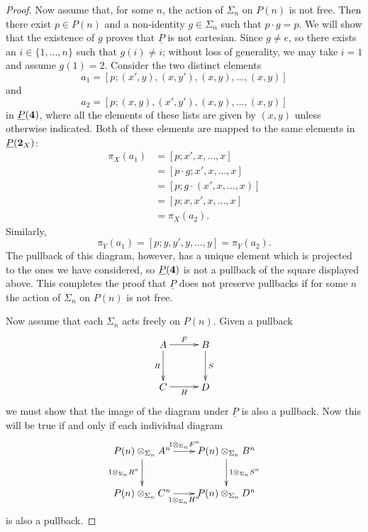 \begin{proof}
Now assume that, for some $n$, the action of $\Sigma_n$ on $P(n)$ is not free. Then there exist $p \in P(n)$ and a non-identity $g \in \Sigma_n$ such that $p \cdot g = p$. We will show that the existence of $g$ proves that $\underline{P}$ is not cartesian.
Since $g \neq e$, so there exists an $i \in \{1, \ldots, n\}$ such that $g(i) \neq i$; without loss of generality, we may take $i=1$ and assume $g(1)=2$. Consider the two distinct elements
    \[
      a_1=  \left[p;(x',y),(x,y'),(x,y),\ldots,(x,y)\right]
    \]
and
    \[
     a_2=   \left[p;(x,y),(x',y'),(x,y),\ldots,(x,y)\right]
    \]
in $\underline{P}(\mathbf{4})$, where all the elements of these lists are given by $(x,y)$ unless otherwise indicated. Both of these elements are mapped to the same elements in $\underline{P}(\mathbf{2}_X)$:
    \begin{align*}
           \pi_X(a_1) & = \left[p; x', x, \ldots, x\right] \\
           &= \left[p \cdot g; x', x, \ldots, x\right]\\
          &= \left[p;g\cdot (x', x, \ldots, x)\right]\\
          &= \left[p;x,x',x,\ldots,x\right] \\
          & = \pi_X(a_2).
    \end{align*}
Similarly, 
    \[
        \pi_Y(a_1) = \left[p;y,y',y, \ldots, y\right] = \pi_Y(a_2).
    \]
The pullback of this diagram, however, has a unique element which is projected to the ones we have considered, so $\underline{P}(\mathbf{4})$ is not a pullback of the square displayed above. This completes the proof that $\underline{P}$ does not preserve pullbacks if for some $n$ the action of $\Sigma_n$ on $P(n)$ is not free.

Now assume that each $\Sigma_n$ acts freely on $P(n)$. Given a pullback
    \[
        \xy
            (0,0)*+{A}="00";
            (15,0)*+{B}="10";
            (0,-15)*+{C}="01";
            (15,-15)*+{D}="11";
            {\ar^{F} "00" ; "10"};
            {\ar^{S} "10" ; "11"};
            {\ar_{R} "00" ; "01"};
            {\ar_{H} "01" ; "11"};
        \endxy
    \]
we must show that the image of the diagram under $\underline{P}$ is also a pullback. Now this will be true if and only if each individual diagram
        \[
            \xy
                (0,0)*+{\coeqsig{P}{A}{n}}="00";
                (30,0)*+{\coeqsig{P}{B}{n}}="10";
                (0,-15)*+{\coeqsig{P}{C}{n}}="01";
                (30,-15)*+{\coeqsig{P}{D}{n}}="11";
                {\ar^{\coeqb{1}{F^n}{\Sigma_{n}}} "00" ; "10"};
                {\ar^{\coeqb{1}{S^n}{\Sigma_{n}}} "10" ; "11"};
                {\ar_{\coeqb{1}{R^n}{\Sigma_{n}}} "00" ; "01"};
                {\ar_{\coeqb{1}{H^n}{\Sigma_{n}}} "01" ; "11"}:
            \endxy
    \]
is also a pullback. 


\end{proof}
